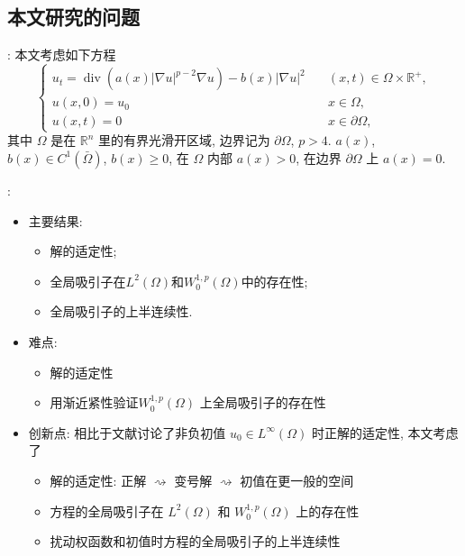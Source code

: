 \documentclass[UTF8]{ctexbeamer}
\newcommand*\abs[1]{\lvert#1\rvert}
\newcommand\R{\mathbb{R}}
\DeclareMathOperator{\Div}{div}
\begin{document}
\subsection{本文研究的问题}
\begin{frame}{\secname : \subsecname}
    本文考虑如下方程
    \begin{equation}\label{eq:main}
        \begin{cases}
            u_t = \Div(a(x)\abs{\nabla u}^{p-2}\nabla u) - b(x)\abs{\nabla u}^2 \quad &(x, t) \in \Omega \times \R^+,\\
            u(x,0) = u_0 \quad &x \in \Omega,\\
            u(x, t) = 0 \quad &x \in \partial\Omega,
        \end{cases}
    \end{equation}
    其中 $\Omega$ 是在 $\R^{n}$ 里的有界光滑开区域, 边界记为 $\partial\Omega$, $p>4$.
    $ a(x)$, $b(x) \in C^1(\bar{\Omega}) $, $b(x) \geq 0$, 在 $\Omega$ 内部 $a(x) > 0$, 在边界 $\partial\Omega$ 上 $a(x) = 0$.
\end{frame}
\begin{frame}{\secname : \subsecname}
    \begin{itemize}
        \item 主要结果:
        \begin{itemize}
            \item 解的适定性;
            \item 全局吸引子在$L^2(\Omega)$和$W_0^{1, p}(\Omega)$中的存在性;
            \item 全局吸引子的上半连续性.
        \end{itemize}
        \item 难点:
        \begin{itemize}
            \item 解的适定性
            \item 用渐近紧性验证$W_0^{1, p}(\Omega)$ 上全局吸引子的存在性
        \end{itemize}
        \item 创新点: 相比于文献讨论了非负初值
        $u_0 \in L^\infty(\Omega)$ 时正解的适定性, 本文考虑了
        \begin{itemize}
            \item 解的适定性: 正解 $\rightsquigarrow$ 变号解 $\rightsquigarrow$ 初值在更一般的空间
            \item 方程的全局吸引子在 $L^2(\Omega)$ 和 $W_0^{1, p}(\Omega)$ 上的存在性
            \item 扰动权函数和初值时方程的全局吸引子的上半连续性
        \end{itemize}
    \end{itemize}
\end{frame}
\end{document}
